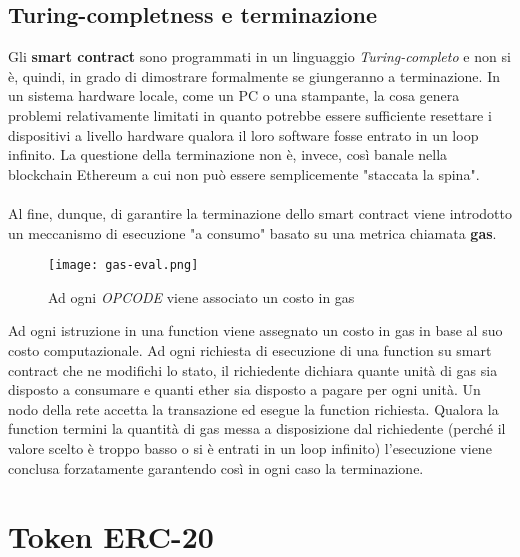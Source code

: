     \subsection{Turing-completness e terminazione}
    \label{contesto:ethereum:terminazione}
    Gli \textbf{smart contract} sono programmati in un linguaggio \textit{Turing-completo} e non si è, quindi, in grado di dimostrare formalmente se giungeranno a terminazione. In un sistema hardware locale, come un PC o una stampante, la cosa genera problemi relativamente limitati in quanto potrebbe essere sufficiente resettare i dispositivi a livello hardware qualora il loro software fosse entrato in un loop infinito. La questione della terminazione non è, invece, così banale nella blockchain Ethereum a cui non può essere semplicemente "staccata la spina".
    \\\\
    Al fine, dunque, di garantire la terminazione dello smart contract viene introdotto un meccanismo di esecuzione "a consumo" basato su una metrica chiamata \textbf{gas}.

    \begin{figure}[h!]
        \centering
        \texttt{[image: gas-eval.png]}
        \caption{Ad ogni \textit{OPCODE} viene associato un costo in gas}
    \end{figure}

    Ad ogni istruzione in una function viene assegnato un costo in gas in base al suo costo computazionale. Ad ogni richiesta di esecuzione di una function su smart contract che ne modifichi lo stato, il richiedente dichiara quante unità di gas sia disposto a consumare e quanti ether sia disposto a pagare per ogni unità. Un nodo della rete accetta la transazione ed esegue la function richiesta. Qualora la function termini la quantità di gas messa a disposizione dal richiedente (perché il valore scelto è troppo basso o si è entrati in un loop infinito) l'esecuzione viene conclusa forzatamente garantendo così in ogni caso la terminazione.

\section{Token ERC-20}

